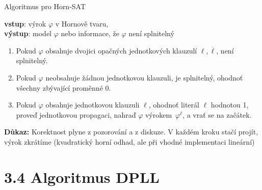 \documentclass{beamer}
\begin{document}
\begin{frame}{Algoritmus pro Horn-SAT}

    \textbf{vstup}: výrok $\varphi$ v Hornově tvaru,\\ \textbf{výstup}: model $\varphi$ nebo informace, že $\varphi$ není splnitelný
    \begin{enumerate}
        \item Pokud $\varphi$ obsahuje dvojici opačných jednotkových klauzulí $\ell,\overline{\ell}$, není splnitelný.
        \item Pokud $\varphi$ neobsahuje žádnou jednotkovou klauzuli, je splnitelný, ohodnoť všechny zbývající proměnné 0.
        \item Pokud $\varphi$ obsahuje jednotkovou klauzuli $\ell$, ohodnoť literál $\ell$ hodnotou 1, proveď jednotkovou propagaci, nahraď $\varphi$ výrokem~$\varphi^\ell$, a vrať se na začátek.
    \end{enumerate}
    
    \pause

    \pause
    \textbf{Důkaz:} {\small Korektnost plyne z pozorování a z diskuze. V každém kroku stačí projít, výrok zkrátíme (kvadratický horní odhad, ale při vhodné implementaci lineární)}\hfill\qedsymbol

\end{frame}


\section{3.4 Algoritmus DPLL}
\end{document}
